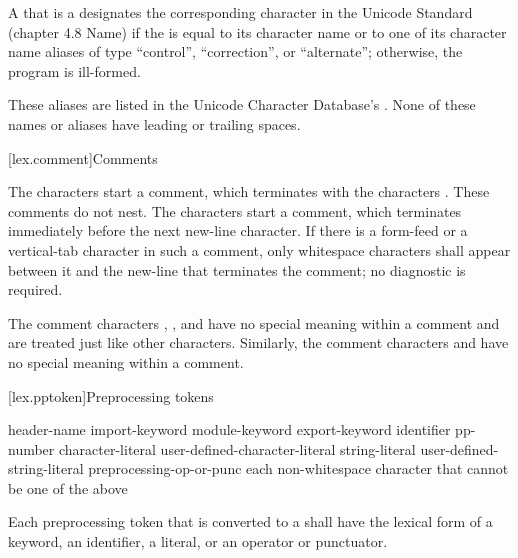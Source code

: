 \pnum
A 
that is a 
designates the corresponding character
in the Unicode Standard (chapter 4.8 Name)
if the  is equal
to its character name or
to one of its character name aliases of
type ``control'', ``correction'', or ``alternate'';
otherwise, the program is ill-formed.
\begin{note}
These aliases are listed in
the Unicode Character Database's .
None of these names or aliases have leading or trailing spaces.
\end{note}

[lex.comment]{Comments}

\pnum
{}%
%
%
The characters \tcode{/*} start a comment, which terminates with the
characters \tcode{*/}. These comments do not nest.
%
The characters \tcode{//} start a comment, which terminates immediately before the
next new-line character. If there is a form-feed or a vertical-tab
character in such a comment, only whitespace characters shall appear
between it and the new-line that terminates the comment; no diagnostic
is required.
\begin{note}
The comment characters \tcode{//}, \tcode{/*},
and \tcode{*/} have no special meaning within a \tcode{//} comment and
are treated just like other characters. Similarly, the comment
characters \tcode{//} and \tcode{/*} have no special meaning within a
\tcode{/*} comment.
\end{note}

[lex.pptoken]{Preprocessing tokens}

%
\begin{bnf}
\br
    header-name\br
    import-keyword\br
    module-keyword\br
    export-keyword\br
    identifier\br
    pp-number\br
    character-literal\br
    user-defined-character-literal\br
    string-literal\br
    user-defined-string-literal\br
    preprocessing-op-or-punc\br
    \textnormal{each non-whitespace character that cannot be one of the above}
\end{bnf}

\pnum
Each preprocessing token that is converted to a 
shall have the lexical form of a keyword, an identifier, a literal,
or an operator or punctuator.

